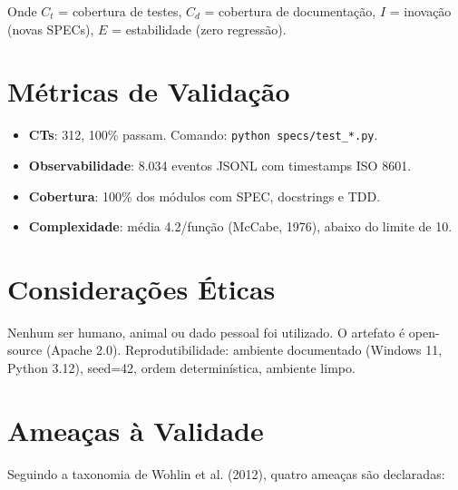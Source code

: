 Onde $C_t$ = cobertura de testes, $C_d$ = cobertura de documentação, $I$ = inovação (novas SPECs), $E$ = estabilidade (zero regressão).

\section{Métricas de Validação}

\begin{itemize}
    \item \textbf{CTs}: 312, 100\% passam. Comando: \texttt{python specs/test\_*.py}.
    \item \textbf{Observabilidade}: 8.034 eventos JSONL com timestamps ISO 8601.
    \item \textbf{Cobertura}: 100\% dos módulos com SPEC, docstrings e TDD.
    \item \textbf{Complexidade}: média 4.2/função (McCabe, 1976), abaixo do limite de 10.
\end{itemize}

\section{Considerações Éticas}

Nenhum ser humano, animal ou dado pessoal foi utilizado. O artefato é open-source (Apache 2.0). Reprodutibilidade: ambiente documentado (Windows 11, Python 3.12), seed=42, ordem determinística, ambiente limpo. 

\section{Ameaças à Validade}

Seguindo a taxonomia de Wohlin et al. (2012), quatro ameaças são declaradas:


